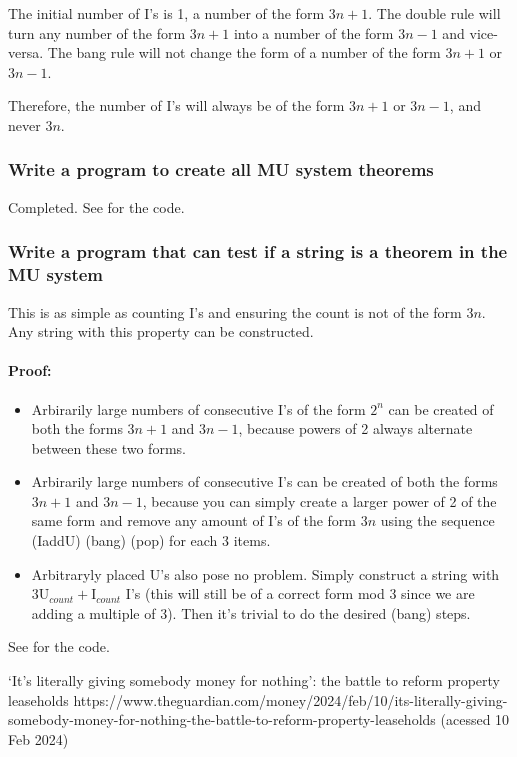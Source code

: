 \documentclass{article}
\begin{document}
The initial number of I's is 1, a number of the form $3n+1$.
The double rule will turn any number of the form $3n+1$ into
a number of the form $3n-1$ and vice-versa.
The bang rule will not change the form of a number of the form
$3n+1$ or $3n-1$.

Therefore, the number of I's will always be of the form
$3n+1$ or $3n-1$, and never $3n$.

\subsubsection{Write a program to create all MU system theorems}
Completed. See  for the code.

\subsubsection{Write a program that can test if a string is a
theorem in the MU system}
This is as simple as counting I's and ensuring the count is not
of the form $3n$. Any string with this property can be constructed.

\paragraph{Proof:}

\begin{itemize}
	\item Arbirarily large numbers of consecutive I's
		of the form $2^n$ can be
		created of both the forms $3n+1$ and $3n-1$, because
		powers of 2 always alternate between these two forms.

	\item Arbirarily large numbers of consecutive I's can be
		created of both the forms $3n+1$ and $3n-1$, because you
		can simply create a larger power of 2 of the same form
		and remove any amount of I's of the form $3n$ using the
		sequence (IaddU) (bang) (pop) for each 3 items.
	
	\item Arbitraryly placed U's also pose no problem. Simply
		construct a string with
		$3\text{U}_{count}+\text{I}_{count}$
		I's (this will still be of a correct form mod 3
		since we are adding a multiple of 3).
		Then it's trivial to do the desired (bang) steps.
	
\end{itemize}

See  for the code.

\pagebreak
\begin{thebibliography}{}
‘It’s literally giving somebody money for nothing’: the battle to reform property leaseholds
https://www.theguardian.com/money/2024/feb/10/its-literally-giving-somebody-money-for-nothing-the-battle-to-reform-property-leaseholds
(acessed 10 Feb 2024)
\end{thebibliography}
\end{document}
